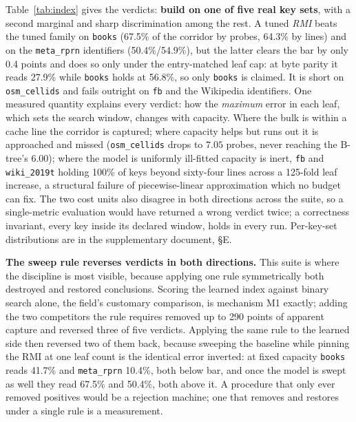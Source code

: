 \documentclass[letterpaper]{article} %
\begin{document}
Table~\ref{tab:index} gives the verdicts: \textbf{build on one of five real key sets}, with a second marginal and sharp discrimination among the rest. A tuned \emph{RMI} beats the tuned family on \texttt{books} (67.5\% of the corridor by probes, 64.3\% by lines) and on the \texttt{meta\_rprn} identifiers (50.4\%/54.9\%), but the latter clears the bar by only 0.4 points and does so only under the entry-matched leaf cap: at byte parity it reads 27.9\% while \texttt{books} holds at 56.8\%, so only \texttt{books} is claimed. It is short on \texttt{osm\_cellids} and fails outright on \texttt{fb} and the Wikipedia identifiers. One measured quantity explains every verdict: how the \emph{maximum} error in each leaf, which sets the search window, changes with capacity. Where the bulk is within a cache line the corridor is captured; where capacity helps but runs out it is approached and missed (\texttt{osm\_cellids} drops to $7.05$ probes, never reaching the B-tree's $6.00$); where the model is uniformly ill-fitted capacity is inert, \texttt{fb} and \texttt{wiki\_2019t} holding 100\% of keys beyond sixty-four lines across a 125-fold leaf increase, a structural failure of piecewise-linear approximation which no budget can fix. The two cost units also disagree in both directions across the suite, so a single-metric evaluation would have returned a wrong verdict twice; a correctness invariant, every key inside its declared window, holds in every run. Per-key-set distributions are in the supplementary document, \S E.

\textbf{The sweep rule reverses verdicts in both directions.} This suite is where the discipline is most visible, because applying one rule symmetrically both destroyed and restored conclusions. Scoring the learned index against binary search alone, the field's customary comparison, is mechanism M1 exactly; adding the two competitors the rule requires removed up to 290 points of apparent capture and reversed three of five verdicts. Applying the same rule to the learned side then reversed two of them back, because sweeping the baseline while pinning the RMI at one leaf count is the identical error inverted: at fixed capacity \texttt{books} reads 41.7\% and \texttt{meta\_rprn} 10.4\%, both below bar, and once the model is swept as well they read 67.5\% and 50.4\%, both above it. A procedure that only ever removed positives would be a rejection machine; one that removes and restores under a single rule is a measurement.
\end{document}
